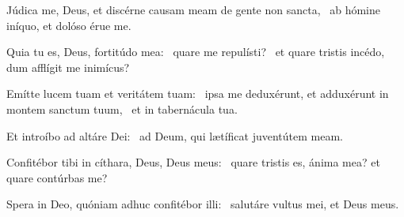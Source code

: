 \item Júdica me, Deus, et discérne causam meam de gente non sancta,~\psstar{} ab hómine iníquo, et dolóso érue me.

\item Quia tu es, Deus, fortitúdo mea:~\pscross{} quare me repulísti?~\psstar{} et quare tristis incédo, dum afflígit me inimícus?

\item Emítte lucem tuam et veritátem tuam:~\pscross{} ipsa me deduxérunt, et adduxérunt in montem sanctum tuum,~\psstar{} et in tabernácula tua.

\item Et introíbo ad altáre Dei:~\psstar{} ad Deum, qui lætíficat juventútem meam.

\item Confitébor tibi in cíthara, Deus, Deus meus:~\psstar{} quare tristis es, ánima mea? et quare contúrbas me?

\item Spera in Deo, quóniam adhuc confitébor illi:~\psstar{} salutáre vultus mei, et Deus meus.

